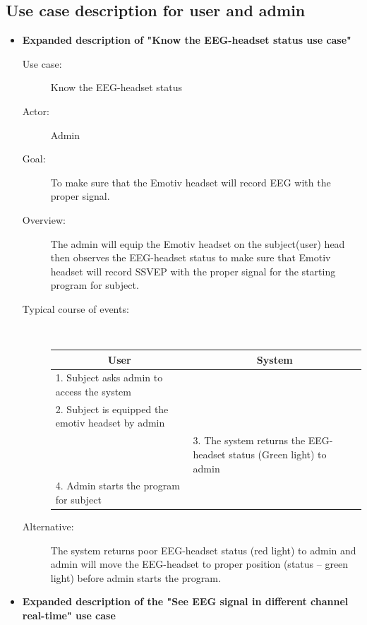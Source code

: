 \subsection{Use case description for user and admin}
\begin{itemize}
	
\item \textbf{Expanded description of "Know the EEG-headset status
use case" }

\begin{description}
	\item [Use case:] Know the EEG-headset status 
	\item [Actor:] Admin 
	\item [Goal:] To make sure that the Emotiv headset will record EEG with
	the proper signal. 
	\item [Overview:] The admin will equip the Emotiv headset on the subject(user)
	head then observes the EEG-headset status to make sure that Emotiv
	headset will record SSVEP with the proper signal for the starting
	program for subject. 
	\item [Typical course of events:]~

	{
		\centering
        
		\begin{tabular}{| m{.47\linewidth} | m{.47\linewidth} |}
			
		\hline 
		\multicolumn{1}{|c}{\textbf{User}} & 
  		\multicolumn{1}{|c|}{\textbf{System}}\\
		\hline 
		1. Subject asks admin to access the system &   \\
		\hline 
		2. Subject is equipped the emotiv headset by admin  &   \\
		\hline 
		& 3. The system returns the EEG-headset status (Green light) to admin \\
		\hline 
		4. Admin starts the program for subject & \\
		\hline 
		
		\end{tabular} 
	}
	\item[Alternative:] The system returns poor EEG-headset status (red light) to admin and admin will move the EEG-headset to proper position (status – green light) before admin starts the program. 

\end{description}

\newpage
\item \textbf{Expanded description of the "See EEG signal in different channel real-time" use case  }


\end{itemize}
